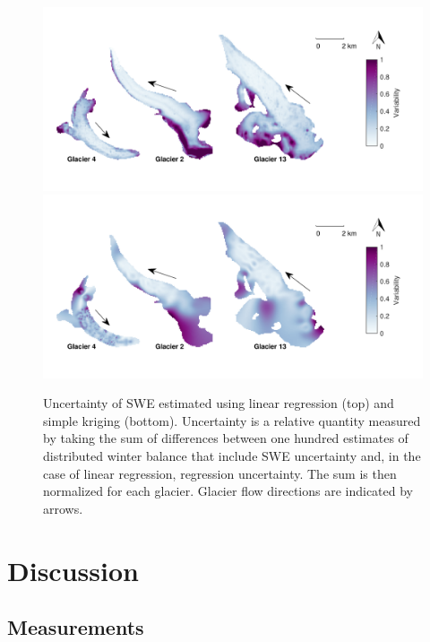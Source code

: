 \documentclass[review,oneside, letterpaper]{igs}
\begin{document}
\begin{figure}
	\centering
	\includegraphics[width =\textwidth]{SpatialVar_LR.pdf}\\
	\vspace{-20 mm}
	\includegraphics[width =\textwidth]{SpatialVar_SK.pdf}\\
	\caption{Uncertainty of SWE estimated using linear regression (top) and simple kriging (bottom). Uncertainty is a relative quantity measured by taking the sum of differences between one hundred estimates of distributed winter balance that include SWE uncertainty and, in the case of linear regression, regression uncertainty. The sum is then normalized for each glacier. Glacier flow directions are indicated by arrows.}
	\label{fig:WSMBspatialvar}
\end{figure}




\section{Discussion}

\subsection{Measurements}
\end{document}
